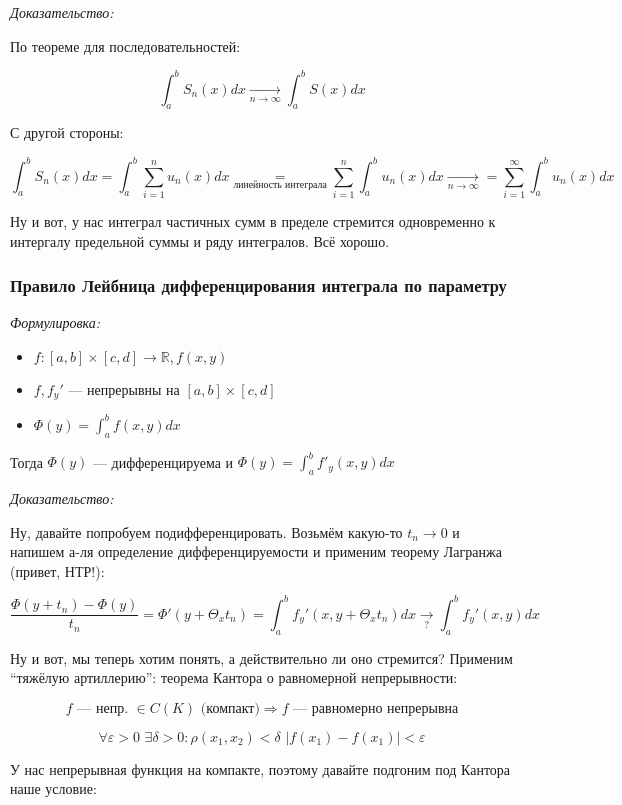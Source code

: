 \documentclass{article}
\def\dbl{\,\,}
\begin{document}
\textit{Доказательство:}

По теореме для последовательностей: 

\[\int_a^b S_n(x) dx \underset{n \rightarrow \infty}{\longrightarrow} \int_a^b S(x) dx\]

С другой стороны:

\[\int_a^b S_n(x) dx = \int_a^b \sum_{i = 1}^n u_n(x) dx \underset{\text{линейность интеграла}}{=} \sum_{i = 1}^n \int_a^b u_n(x) dx \underset{n \rightarrow \infty}{\longrightarrow} = \sum_{i = 1}^{\infty} \int_a^b u_n(x) dx\]

Ну и вот, у нас интеграл частичных сумм в пределе стремится одновременно к интергалу предельной суммы и ряду интегралов. Всё хорошо.

\subsubsection{Правило Лейбница дифференцирования интеграла по параметру}
\textit{Формулировка:}

\begin{itemize}
    \item $f: [a, b] \times [c, d] \rightarrow \mathbb{R}, f(x, y)$
    \item $f, f_y'$ --- непрерывны на $[a, b] \times [c, d]$
    \item $\Phi(y) = \int_a^b f(x, y) dx$
\end{itemize}

Тогда $\Phi(y)$ --- дифференцируема и $\Phi(y) = \int_a^b f'_y(x, y) dx$

\textit{Доказательство:}

Ну, давайте попробуем подифференцировать. Возьмём какую-то $t_n \rightarrow 0$ и напишем а-ля определение дифференцируемости и применим теорему Лагранжа (привет, НТР!):

\[\frac{\Phi(y + t_n) - \Phi(y)}{t_n} = \Phi'(y + \Theta_x t_n) = \int_a^b f_y'(x, y + \Theta_x t_n) dx \underset{?}{\longrightarrow} \int_a^b f_y'(x, y) dx\]

Ну и вот, мы теперь хотим понять, а действительно ли оно стремится? Применим ``тяжёлую артиллерию'': теорема Кантора о равномерной непрерывности:

\[f \text{ --- непр. } \in C(K) \text{ (компакт)} \Rightarrow f\text{ --- равномерно непрерывна}\]

\[\forall \varepsilon > 0 \dbl \exists \delta > 0: \rho(x_1, x_2) < \delta \dbl |f(x_1) - f(x_1)| < \varepsilon\]

У нас непрерывная функция на компакте, поэтому давайте подгоним под Кантора наше условие:
\end{document}
